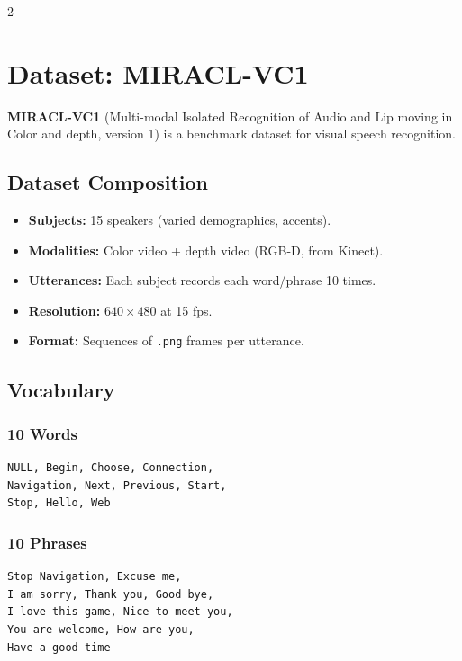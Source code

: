 \documentclass[10pt, a4paper]{article}
\begin{document}
\begin{multicols}{2}
\section{Dataset: MIRACL-VC1}

\textbf{MIRACL-VC1} (Multi-modal Isolated Recognition of Audio and Lip
moving in Color and depth, version 1) is a benchmark dataset for visual
speech recognition.

\subsection{Dataset Composition}
\begin{itemize}
  \item \textbf{Subjects:} 15 speakers (varied demographics, accents).
  \item \textbf{Modalities:} Color video + depth video (RGB-D, from Kinect).
  \item \textbf{Utterances:} Each subject records each word/phrase 10 times.
  \item \textbf{Resolution:} $640 \times 480$ at 15 fps.
  \item \textbf{Format:} Sequences of \texttt{.png} frames per utterance.
\end{itemize}

\subsection{Vocabulary}

\subsubsection{10 Words}
\begin{codebox}
\footnotesize
\begin{verbatim}
NULL, Begin, Choose, Connection,
Navigation, Next, Previous, Start,
Stop, Hello, Web
\end{verbatim}
\end{codebox}

\subsubsection{10 Phrases}
\begin{codebox}
\footnotesize
\begin{verbatim}
Stop Navigation, Excuse me,
I am sorry, Thank you, Good bye,
I love this game, Nice to meet you,
You are welcome, How are you,
Have a good time
\end{verbatim}
\end{codebox}


\end{multicols}
\end{document}
